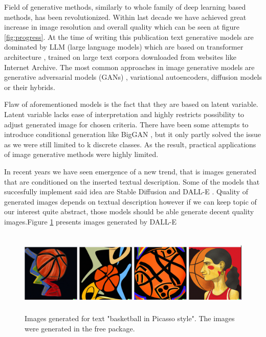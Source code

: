 \documentclass[10pt]{article}
\begin{document}
Field of generative methods, similarly to whole family of deep learning based methods, has been revolutionized. Within last decade we have achieved great increase in image resolution and overall quality which can be seen at figure \ref{fig:progress}. At the time of writing this publication text generative models are dominated by LLM (large language models) which are based on transformer architecture \cite{transformery}, trained on large text corpora downloaded from websites like Internet Archive. The most common approaches in image generative models are generative adversarial models (GANs) \cite{gan_base}, variational autoencoders, diffusion models or their hybrids. 

Flaw of aforementioned models is the fact that they are based on latent variable. Latent variable lacks ease of interpretation and highly restricts possibility to adjust generated image for chosen criteria. There have been some attempts to introduce conditional generation like BigGAN \cite{bigGAN}, but it only partly solved the issue as we were still limited to k discrete classes. As the result, practical applications of image generative methods were highly limited. 

In recent years we have seen emergence of a new trend, that is images generated that are conditioned on the inserted textual description. Some of the models that succesfully implement said idea are Stable Diffusion \cite{stable_diff} and DALL-E \cite{dalle_3}. Quality of generated images depends on textual description however if we can keep topic of our interest quite abstract, those models should be able generate decent quality images.Figure \ref{fig:dalle_example_ball} presents images generated by DALL-E 
\begin{figure}[H]
    \centering
    \includegraphics[width = 12cm, height = 4cm]{dalle-example.png}
    \caption[Images generated for text "basketball in Picasso style".]
    {Images generated for text "basketball in Picasso style". The images were generated in the free package. }
    \label{fig:dalle_example_ball}
\end{figure}
\end{document}
